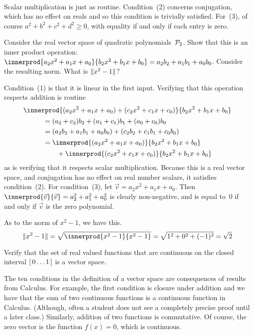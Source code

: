 \begin{exercises}
\begin{answer}
\begin{multline*}
\end{multline*}
Scalar multiplication is just as routine.
Condition~(2) concerns conjugation, 
which has no effect on reals and 
so this condition is trivially satisfied. 
For~(3), of course $a^2+b^2+c^2+d^2\geq 0$, with equality if and only
if each entry is zero.
\end{answer}
%
\item Consider the real vector space of quadratic polynomials~$\mathcal{P}_2$.
Show that this is an inner product operation:
$\innerprod{a_2x^2+a_1x+a_0}{b_2x^2+b_1x+b_0}=a_2b_2+a_1b_1+a_0b_0$. 
Consider the resulting norm.
What is $\lVert x^2-1\rVert$?
\begin{answer}
Condition~(1) is that it is linear in the first input.
Verifying that this operation respects addition is routine
\begin{multline*}
  \innerprod{(a_2x^2+a_1x+a_0)+(c_2x^2+c_1x+c_0)}{b_2x^2+b_1x+b_0}  \\
  \begin{split}
    &=(a_2+c_2)b_2+(a_1+c_1)b_1+(a_0+c_0)b_0             \\
    &=(a_2b_2+a_1b_1+a_0b_0)+(c_2b_2+c_1b_1+c_0b_0)             \\
    &=\innerprod{(a_2x^2+a_1x+a_0)}{b_2x^2+b_1x+b_0}      \\
      &\qquad+\innerprod{(c_2x^2+c_1x+c_0)}{b_2x^2+b_1x+b_0}
  \end{split}
\end{multline*}
as is verifying that it respects scalar multiplication.
Because this is a real vector space, and conjugation has no effect on
real number scalars, it satisfies condition~(2).
For condition~(3), let $\vec{v}=a_2x^2+a_1x+a_0$.
Then $\innerprod{\vec{v}}{\vec{v}}=a_2^2+a_1^2+a_0^2$ is clearly non-negative,
and is equal to~$0$ if and only if $\vec{v}$ is the zero polynomial.

As to the norm of $x^2-1$, we have this.
\begin{equation*} 
 \norm{x^2-1}=\sqrt{\innerprod{x^2-1}{x^2-1}}=\sqrt{1^2+0^2+(-1)^2}=\sqrt{2}
\end{equation*}
\end{answer}

\item Verify that the set of real valued functions that are continuous on the 
closed interval $[\,0\ldots 1\,]$ is a vector space.
\begin{answer}
The ten conditions in the definition of a vector space
are consequences of results from Calculus.
For example, the first condition is closure under addition and we
have that the sum of two continuous functions is a continuous function 
in Calculus.
(Although, often a student does not see a completely precise proof 
until a later class.)
Similarly, addition of two functions is commutative.
Of course, the zero vector is the function $f(x)=0$, which is continuous.
\end{answer}


\end{exercises}
